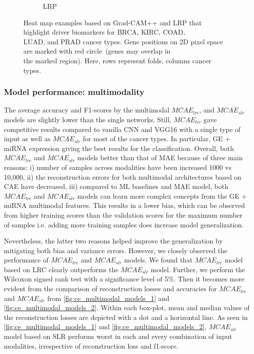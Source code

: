 \begin{figure}
\begin{subfigure}{0.48\linewidth}
		\caption{LRP}
        \label{fig:lrp}
	\end{subfigure}
	\caption[Heatmap example to mark driver biomarker for different cancer types]{Heat map examples based on Grad-CAM++ and LRP that highlight driver biomarkers for BRCA, KIRC, COAD,\\ LUAD, and PRAD cancer types. Gene positions on 2D pixel space are marked with red circle~(genes may overlap in\\ the marked region). Here, rows represent folds,  columns cancer types.} 
	\label{fig:hm_all}
	\vspace{-2mm}
\end{figure}

\subsubsection{Model performance: multimodality}
The average accuracy and F1-scores by the multimodal $MCAE_{lrc}$, and $MCAE_{slr}$ models are slightly lower than the single networks. Still, $MCAE_{lrc}$ gave competitive results compared to vanilla CNN and VGG16 with a single type of input as well as $MCAE_{slr}$ for most of the cancer types. 
In particular, GE + miRNA expression giving the best results for the classification.
Overall, both $MCAE_{lrc}$ and $MCAE_{slr}$ models better than that of MAE because of three main reasons: i) number of samples across modalities have been increased 1000 vs 10,000, ii) the reconstruction errors for both multimodal architectures based on CAE have decreased, iii) compared to ML baselines and MAE model, both $MCAE_{lrc}$ and $MCAE_{slr}$ models can learn more complex concepts from the GE + miRNA multimodal features. This results in a lower bias, which can be observed from higher training scores than the validation scores for the maximum number of samples i.e. adding more training samples does increase model generalization. 

\hspace*{3.5mm} Nevertheless, the latter two reasons helped improve the generalization by mitigating both bias and variance errors. However, we closely observed the performance of $MCAE_{lrc}$ and $MCAE_{slr}$ models. We found that $MCAE_{lrc}$ model based on LRC clearly outperforms the $MCAE_{slr}$ model. Further, we perform the Wilcoxon signed rank test with a significance level of 5\%. Then it becomes more evident from the comparison of reconstruction losses and accuracies for $MCAE_{lrc}$ and $MCAE_{slr}$ from \cref{fig:ce_multimodal_models_1} and \cref{fig:ce_multimodal_models_2}. Within each box-plot, mean and median values of the reconstruction losses are depicted with a dot and a horizontal line. As seen in \cref{fig:ce_multimodal_models_1} and \cref{fig:ce_multimodal_models_2}, $MCAE_{slr}$ model based on SLR performs worst in each and every combination of input modalities, irrespective of reconstruction loss and f1-score. 

